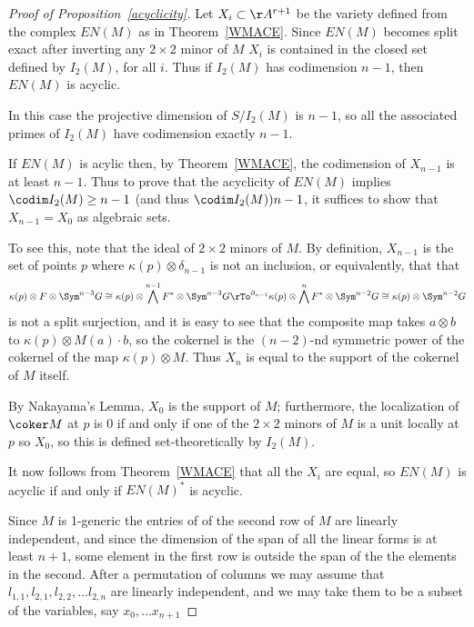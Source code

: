 \begin{proof}[Proof of Proposition~\ref{acyclicity}]
Let $X_{i}\subset \AA^{r+1}$ be the variety defined from the complex $EN(M)$ as in 
Theorem~\ref{WMACE}. Since $EN(M)$ becomes split exact after inverting any $2\times 2$ minor of $M$
$X_{i}$ is
contained in the closed set defined by $I_{2}(M)$, for all $i$. Thus if $I_{2}(M)$ has codimension $n-1$,
then $EN(M)$ is acyclic. 

In this case the projective dimension
of $S/I_{2}(M)$ is $n-1$, so all the associated primes of $I_{2}(M)$ have codimension
exactly $n-1$.

If $EN(M)$ is  acylic then, by Theorem~\ref{WMACE}, the codimension of $X_{n-1}$ is at least $n-1$. Thus to prove that the acyclicity of $EN(M)$ implies  $\codim I_{2}(M) \geq n-1$ (and thus
$\codim I_{2}(M))  n-1$, it suffices to show that $X_{n-1} = X_{0}$ as algebraic sets.

To see this, note that
the ideal of $2\times 2$ minors of $M$. By definition, $X_{n-1}$ 
is the set of points $p$ where $\kappa(p)\otimes \delta_{n-1}$ is not an inclusion, 
or equivalently, that 
that 
$$
\kappa(p)\otimes F\otimes \Sym^{n-3}G 
\cong 
\kappa(p)\otimes \bigwedge^{n-1} F^{*} \otimes  \Sym^{n-3}G 
\rTo^{\partial_{n-1}}
\kappa(p)\otimes \bigwedge^{n} F^{*} \otimes  \Sym^{n-2}G
\cong
\kappa(p)\otimes \Sym^{n-2}G
$$
is not a split surjection, and it is easy to see that the composite map takes
$a\otimes b$ to $\kappa(p) \otimes M(a)\cdot b$, so the cokernel is the $(n-2)$-nd symmetric power
of the cokernel of the map $\kappa(p) \otimes M$. Thus $X_{n}$ is equal to the support
of the cokernel of $M$ itself. 

By Nakayama's Lemma, $X_{0}$ is the support of $M$; furthermore, the localization of $\coker M$ at $p$ is 0 if and only if
one of the 
$2\times 2$ minors of $M$ is a unit locally at $p$ so $X_{0}$, so this is defined
set-theoretically by $I_{2}(M)$.

It now follows from Theorem~\ref{WMACE} that all the $X_{i}$ are equal, so $EN(M)$ is 
acyclic if and only if $EN(M)^{*}$ is acyclic. 


Since $M$ is 1-generic the entries of of the second row of $M$ are linearly independent, and since the dimension of the span of all the linear forms is at least $n+1$, some element in the first row is outside the span of the the elements in the second. After a permutation of columns we may assume that $l_{1,1}, l_{2,1}, l_{2,2},\dots l_{2,n}$ are linearly independent, and we may take them to be a subset of the variables, say $x_{0},\dots x_{n+1}$


\end{proof}
